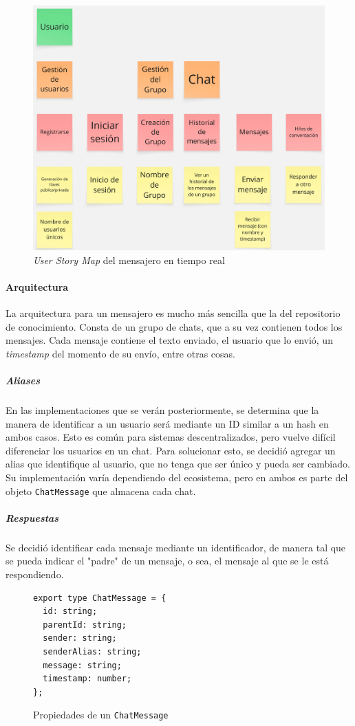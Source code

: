 \begin{figure}[H]
    \centering
    \includegraphics[width=0.5\linewidth]{img/usm-mensajero.jpg}
    \caption{\textit{User Story Map} del mensajero en tiempo real}
    \label{fig:enter-label}
\end{figure}

\paragraph{Arquitectura}

La arquitectura para un mensajero es mucho más sencilla que la del repositorio de conocimiento. Consta de un grupo de chats, que a su vez contienen todos los mensajes. Cada mensaje contiene el texto enviado, el usuario que lo envió, un \textit{timestamp} del momento de su envío, entre otras cosas.

\subparagraph{Aliases} En las implementaciones que se verán posteriormente, se determina que la manera de identificar a un usuario será mediante un ID similar a un hash en ambos casos. Esto es común para sistemas descentralizados, pero vuelve difícil diferenciar los usuarios en un chat. Para solucionar esto, se decidió agregar un alias que identifique al usuario, que no tenga que ser único y pueda ser cambiado. Su implementación varía dependiendo del ecosistema, pero en ambos es parte del objeto \texttt{ChatMessage} que almacena cada chat.

\subparagraph{Respuestas} Se decidió identificar cada mensaje mediante un identificador, de manera tal que se pueda indicar el "padre" de un mensaje, o sea, el mensaje al que se le está respondiendo.

\begin{figure}[H]
    \centering
    \begin{minipage}{0.9\linewidth}
        \lstset{
            basicstyle=\ttfamily\small,
            frame=single,
            captionpos=b
        }
        \begin{lstlisting}
export type ChatMessage = {
  id: string;
  parentId: string;
  sender: string;
  senderAlias: string;
  message: string;
  timestamp: number;
};\end{lstlisting}
    \end{minipage}
    \caption{Propiedades de un \texttt{ChatMessage}}
    \label{fig:version-type}
\end{figure}

